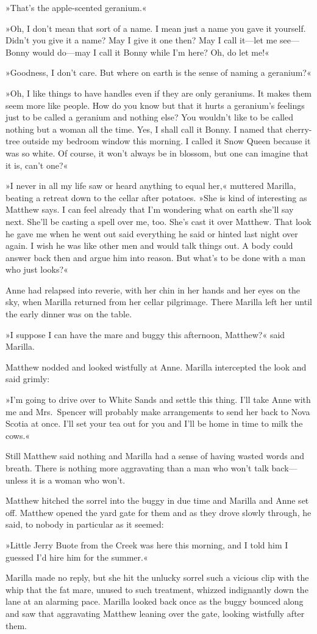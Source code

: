 »That's the apple-scented geranium.«

»Oh, I don't mean that sort of a name. I mean just a name you gave it yourself. Didn't you give it a name? May I give it one then? May I call it—let me see—Bonny would do—may I call it Bonny while I'm here? Oh, do let me!«

»Goodness, I don't care. But where on earth is the sense of naming a geranium?«

»Oh, I like things to have handles even if they are only geraniums. It makes them seem more like people. How do you know but that it hurts a geranium's feelings just to be called a geranium and nothing else? You wouldn't like to be called nothing but a woman all the time. Yes, I shall call it Bonny. I named that cherry-tree outside my bedroom window this morning. I called it Snow Queen because it was so white. Of course, it won't always be in blossom, but one can imagine that it is, can't one?«

»I never in all my life saw or heard anything to equal her,« muttered Marilla, beating a retreat down to the cellar after potatoes. »She is kind of interesting as Matthew says. I can feel already that I'm wondering what on earth she'll say next. She'll be casting a spell over me, too. She's cast it over Matthew. That look he gave me when he went out said everything he said or hinted last night over again. I wish he was like other men and would talk things out. A body could answer back then and argue him into reason. But what's to be done with a man who just looks?«

Anne had relapsed into reverie, with her chin in her hands and her eyes on the sky, when Marilla returned from her cellar pilgrimage. There Marilla left her until the early dinner was on the table.

»I suppose I can have the mare and buggy this afternoon, Matthew?« said Marilla.

Matthew nodded and looked wistfully at Anne. Marilla intercepted the look and said grimly:

»I'm going to drive over to White Sands and settle this thing. I'll take Anne with me and Mrs.~Spencer will probably make arrangements to send her back to Nova Scotia at once. I'll set your tea out for you and I'll be home in time to milk the cows.«

Still Matthew said nothing and Marilla had a sense of having wasted words and breath. There is nothing more aggravating than a man who won't talk back—unless it is a woman who won't.

Matthew hitched the sorrel into the buggy in due time and Marilla and Anne set off. Matthew opened the yard gate for them and as they drove slowly through, he said, to nobody in particular as it seemed:

»Little Jerry Buote from the Creek was here this morning, and I told him I guessed I'd hire him for the summer.«

Marilla made no reply, but she hit the unlucky sorrel such a vicious clip with the whip that the fat mare, unused to such treatment, whizzed indignantly down the lane at an alarming pace. Marilla looked back once as the buggy bounced along and saw that aggravating Matthew leaning over the gate, looking wistfully after them.

